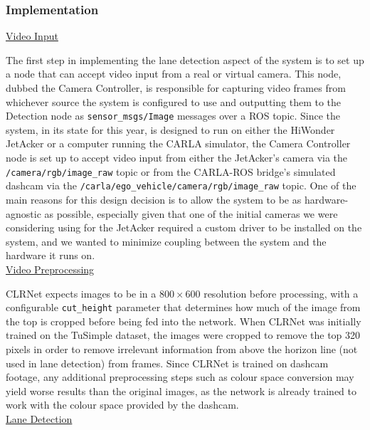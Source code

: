 \documentclass[titlepage,draft]{article}
\begin{document}
{\subsubsection{Implementation}
\underline{Video Input}

The first step in implementing the lane detection aspect of the system is to set up a node that can accept video input
from a real or virtual camera.
This node, dubbed the Camera Controller, is responsible for capturing video frames from whichever source the system is
configured to use and outputting them to the Detection node as \texttt{sensor\_msgs/Image} messages over a ROS topic.
Since the system, in its state for this year, is designed to run on either the HiWonder JetAcker or a computer running
the CARLA simulator, the Camera Controller node is set up to accept video input from either the JetAcker's camera
via the \texttt{/camera/rgb/image\_raw} topic or from the CARLA-ROS bridge's simulated dashcam via the
\texttt{/carla/ego\_vehicle/camera/rgb/image\_raw} topic.
One of the main reasons for this design decision is to allow the system to be as hardware-agnostic as possible,
especially given that one of the initial cameras we were considering using for the JetAcker required a custom driver
to be installed on the system, and we wanted to minimize coupling between the system and the hardware it runs on.
\\

\underline{Video Preprocessing}

CLRNet expects images to be in a $800 \times 600$ resolution before processing, with a configurable \texttt{cut\_height}
parameter that determines how much of the image from the top is cropped before being fed into the network.
When CLRNet was initially trained on the TuSimple dataset, the images were cropped to remove the top 320 pixels in order
to remove irrelevant information from above the horizon line (not used in lane detection) from frames.
Since CLRNet is trained on dashcam footage, any additional preprocessing steps such as colour space conversion
may yield worse results than the original images, as the network is already trained to work with the colour space
provided by the dashcam.
\\

\underline{Lane Detection}

}
\end{document}
